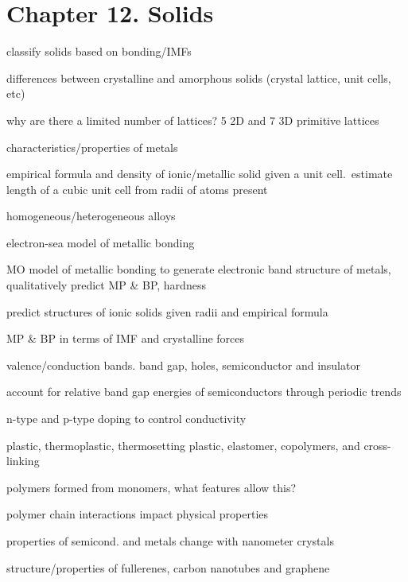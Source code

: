 \section{Chapter 12. Solids}

\secttoc

{
\footnotesize
\begin{multicols}{3}
    \begin{compactenum}
    \item classify solids based on bonding/IMFs
    \item differences between crystalline and amorphous solids
        (crystal lattice, unit cells, etc)
    \item why are there a limited number of lattices? 5 2D and 7 3D
        primitive lattices
    \item characteristics/properties of metals
    \item empirical formula and density of ionic/metallic solid given a unit cell.\
        estimate length of a cubic unit cell from radii of atoms present
    \item homogeneous/heterogeneous alloys
    \item electron-sea model of metallic bonding
    \item MO model of metallic bonding to generate electronic band structure
        of metals, qualitatively predict MP \& BP, hardness
    \item predict structures of ionic solids given radii and empirical formula
    \item MP \& BP in terms of IMF and crystalline forces
    \item valence/conduction bands. band gap, holes, semiconductor and insulator
    \item account for relative band gap energies of semiconductors through periodic trends
    \item n-type and p-type doping to control conductivity
    \item plastic, thermoplastic, thermosetting plastic, elastomer, copolymers,
        and cross-linking
    \item polymers formed from monomers, what features allow this?
    \item polymer chain interactions impact physical properties
    \item properties of semicond. and metals change with nanometer crystals
    \item structure/properties of fullerenes, carbon nanotubes and graphene
    \end{compactenum}
\end{multicols}
}

